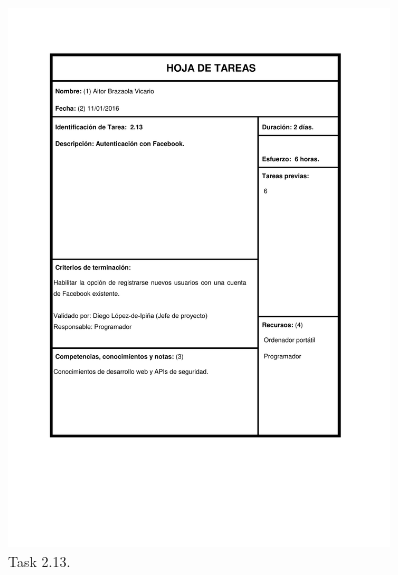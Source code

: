 \documentclass{DeustoFDP}
\begin{document}
\begin{figure}[H]
	\centering
	\includegraphics[width=0.9\textwidth]{fig/Tareas/213}
	\caption{Task 2.13.}
	\label{fig:t213}
\end{figure}
\end{document}
